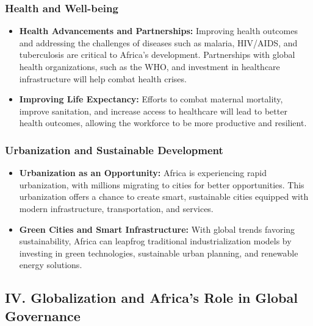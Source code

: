 \documentclass[10pt]{article}
\begin{document}
\subsubsection*{Health and Well-being}
\begin{itemize}
  \item \textbf{Health Advancements and Partnerships:} Improving health outcomes and
    addressing the challenges of diseases such as malaria, HIV/AIDS, and tuberculosis
    are critical to Africa's development. Partnerships with global health organizations,
    such as the WHO, and investment in healthcare infrastructure will help combat
    health crises.

  \item \textbf{Improving Life Expectancy:} Efforts to combat maternal mortality, improve
    sanitation, and increase access to healthcare will lead to better health outcomes,
    allowing the workforce to be more productive and resilient.
\end{itemize}

\subsubsection*{Urbanization and Sustainable Development}
\begin{itemize}
  \item \textbf{Urbanization as an Opportunity:} Africa is experiencing rapid urbanization, with
    millions migrating to cities for better opportunities. This urbanization offers a
    chance to create smart, sustainable cities equipped with modern infrastructure,
    transportation, and services.

  \item \textbf{Green Cities and Smart Infrastructure:} With global trends favoring sustainability,
    Africa can leapfrog traditional industrialization models by investing in green
    technologies, sustainable urban planning, and renewable energy solutions.
\end{itemize}

\subsection*{IV. Globalization and Africa's Role in Global Governance}
\end{document}
